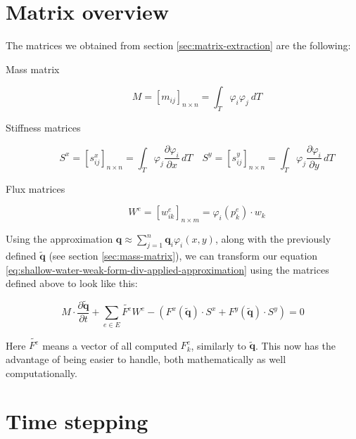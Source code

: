 \documentclass[a4paper, twoside]{article}
\newcommand{\pd}[2]{\dfrac{\partial #1}{\partial #2}}
\renewcommand{\phi}{\varphi}
\begin{document}
\section{Matrix overview}
\label{sec:matrix-listing}

The matrices we obtained from section \ref{sec:matrix-extraction} are the following:

\begin{description}
\item[Mass matrix]
  \begin{equation}
    \label{eq:mass-matrix}
    M = [m_{ij}]_{n \times n} = \int_T \phi_i \phi_j \ dT
  \end{equation}
\item[Stiffness matrices]
  \begin{equation}
    \label{eq:stiffness-matrix}
    S^x = [s_{ij}^x]_{n \times n} = \int_T \phi_j \pd{\phi_i}{x}\, dT\quad
    S^y = [s_{ij}^y]_{n \times n} = \int_T \phi_j \pd{\phi_i}{y}\, dT
  \end{equation}
\item[Flux matrices]
  \begin{equation}
    \label{eq:edge-matrix}
    W^e = [w_{ik}^e]_{n \times m} = \phi_i(p_k^e) \cdot w_k
  \end{equation}
\end{description}

Using the approximation $\mathbf{q} \approx \sum_{j=1}^n \mathbf{q}_i \phi_i\left(x,y\right)$, along with the previously defined $\tilde{\mathbf{q}}$ (see section \ref{sec:mass-matrix}), we can transform our equation \ref{eq:shallow-water-weak-form-div-applied-approximation} using the matrices defined above to look like this:

\begin{equation}
  \label{eq:swe-matrix-form}
  M \cdot \pd{\tilde{\mathbf{q}}}{t} +
  \sum_{e \in E} \tilde{F^e} W^e -
  \left(F^x(\tilde{\mathbf{q}}) \cdot S^x +
    F^y(\tilde{\mathbf{q}}) \cdot S^y\right) = 0
\end{equation}

Here $\tilde{F^e}$ means a vector of all computed $F_k^e$, similarly to $\tilde{\mathbf{q}}$. This now has the advantage of being easier to handle, both mathematically as well computationally.

\section{Time stepping}
\label{sec:computing-integrals}
\end{document}
